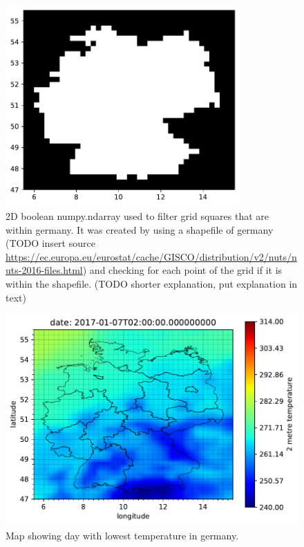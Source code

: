 \begin{figure}[h!]%
\centering
\includegraphics[width=0.8\textwidth]{plots/isin}%
\caption{2D boolean numpy.ndarray used to filter grid squares that are within germany. It was created by using a shapefile of germany (TODO insert source \url{https://ec.europa.eu/eurostat/cache/GISCO/distribution/v2/nuts/nuts-2016-files.html}) and checking for each point of the grid if it is within the shapefile. (TODO shorter explanation, put explanation in text)}%
\label{fig:isin}%
\end{figure}

\begin{figure}[h!]%
\centering
\includegraphics[width=\textwidth]{plots/0_2017010702_20190617161317}%
\caption{Map showing day with lowest temperature in germany.}%
\label{fig:0_2017010702_20190617161317}%
\end{figure}

